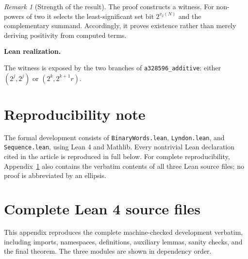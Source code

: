 \documentclass[11pt]{article}
\theoremstyle{definition}
\theoremstyle{remark}
\newtheorem{remark}[theorem]{Remark}
\newenvironment{leanbridge}{%
  \par\smallskip\noindent\textbf{Lean realization.}\par\smallskip%
}{%
  \par\smallskip%
}
\begin{document}
\begin{remark}[Strength of the result]
The proof constructs a witness.  For non-powers of two it selects the
least-significant set bit $2^{v_2(N)}$ and the complementary summand.
Accordingly, it proves existence rather than merely deriving positivity from
computed terms.
\end{remark}
\begin{leanbridge}
The witness is exposed by the two branches of
\texttt{a328596\_additive}: either $(2^j,2^j)$ or
$(2^k,2^{k+1}r)$.
\end{leanbridge}

\section*{Reproducibility note}
The formal development consists of \texttt{BinaryWords.lean},
\texttt{Lyndon.lean}, and \texttt{Sequence.lean}, using Lean 4 and Mathlib.
Every nontrivial Lean declaration cited in the article is reproduced in full below.
For complete reproducibility, Appendix~\ref{app:lean-sources} also contains the
verbatim contents of all three Lean source files; no proof is abbreviated by an ellipsis.


\clearpage
\appendix
\section{Complete Lean 4 source files}\label{app:lean-sources}
This appendix reproduces the complete machine-checked development verbatim, including
imports, namespaces, definitions, auxiliary lemmas, sanity checks, and the final theorem.
The three modules are shown in dependency order.
\end{document}
